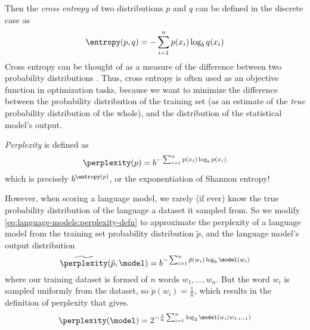 Then the \textit{cross entropy} of two distributions $p$ and $q$ can be defined in the discrete case as
\begin{equation}
    \entropy(p, q) =  - \sum_{i=1}^n p(x_i) \log_b q(x_i) \label{eq:language-models:cross-entropy}
\end{equation}
Cross entropy can be thought of as a measure of the difference between two probability distributions \cite{ManningSchuetze99}.
Thus, cross entropy is often used as an objective function in optimization tasks, because we want to minimize the difference between the probability distribution of the training set (as an estimate of the \textit{true} probability distribution of the whole), and the distribution of the statistical model's output.

\textit{Perplexity} is defined \cite{ManningSchuetze99} as
\begin{equation}
    \perplexity(p) = b^{- \sum_{i=1}^n p(x_i) \log_b p(x_i)} \label{eq:language-models:perplexity-defn}
\end{equation}
which is precisely $b^{\entropy(p)}$, or the exponentiation of Shannon entropy!

However, when scoring a language model, we rarely (if ever) know the true probability distribution of the language a dataset it sampled from.
So we modify \autoref{eq:language-models:perplexity-defn} to approximate the perplexity of a language model from the training set probability distribution $\tilde p$, and the language model's output distribution
\begin{equation}
    \widetilde{\perplexity}(\tilde p, \model)  = b^{- \sum_{i=1}^{n} \tilde{p}(w_i) \log_b \model(w_i)}\label{eq:language-models:perplexity-p-model}
\end{equation}
where our training dataset is formed of $n$ words $w_1, \dots, w_n$.
But the word $w_i$ is sampled uniformly from the dataset, so $\tilde p(w_i) = \frac{1}{n}$, which results in the definition of perplexity that \cite{goldberg_2017} gives.
\begin{equation}
    \perplexity(\model) = 2^{-\frac{1}{n}\sum_{i=1}^n \log_2 \model(w_i \mid w_{1:i-1})} \label{eq:language-models:perplexity}
\end{equation}


